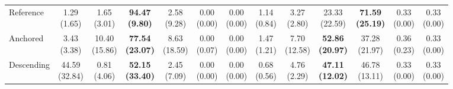 {\begin{tabular}{l|cccccc|cccccc}
Reference & \makecell{1.29 \\ (1.65)} & \makecell{1.65 \\ (3.01)} & {\cellcolor[HTML]{C8E6C9}} \bfseries \makecell{94.47 \\ (9.80)} & \makecell{2.58 \\ (9.28)} & \makecell{0.00 \\ (0.00)} & \makecell{0.00 \\ (0.00)} & \makecell{1.14 \\ (0.84)} & \makecell{3.27 \\ (2.80)} & {\cellcolor[HTML]{C8E6C9}} \makecell{23.33 \\ (22.59)} & \bfseries \makecell{71.59 \\ (25.19)} & \makecell{0.33 \\ (0.00)} & \makecell{0.33 \\ (0.00)} \\
Anchored & \makecell{3.43 \\ (3.38)} & \makecell{10.40 \\ (15.86)} & {\cellcolor[HTML]{C8E6C9}} \bfseries \makecell{77.54 \\ (23.07)} & \makecell{8.63 \\ (18.59)} & \makecell{0.00 \\ (0.07)} & \makecell{0.00 \\ (0.00)} & \makecell{1.47 \\ (1.21)} & \makecell{7.70 \\ (12.58)} & {\cellcolor[HTML]{C8E6C9}} \bfseries \makecell{52.86 \\ (20.97)} & \makecell{37.28 \\ (21.97)} & \makecell{0.36 \\ (0.23)} & \makecell{0.33 \\ (0.00)} \\
Descending & \makecell{44.59 \\ (32.84)} & \makecell{0.81 \\ (4.06)} & {\cellcolor[HTML]{C8E6C9}} \bfseries \makecell{52.15 \\ (33.40)} & \makecell{2.45 \\ (7.09)} & \makecell{0.00 \\ (0.00)} & \makecell{0.00 \\ (0.00)} & \makecell{0.68 \\ (0.56)} & \makecell{4.76 \\ (2.29)} & {\cellcolor[HTML]{C8E6C9}} \bfseries \makecell{47.11 \\ (12.02)} & \makecell{46.78 \\ (13.11)} & \makecell{0.33 \\ (0.00)} & \makecell{0.33 \\ (0.00)} \\
\bottomrule
\end{tabular}
}%

